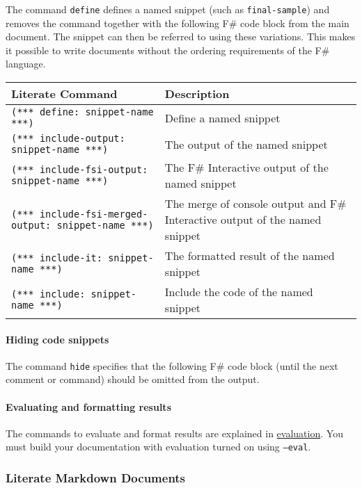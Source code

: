 \documentclass{article}
\begin{document}
The command \texttt{define} defines a named snippet (such as \texttt{final-sample}) and removes the command together with
the following F\# code block from the main document. The snippet can then
be referred to using these variations. This makes it
possible to write documents without the ordering requirements of the
F\# language.
\begin{tabular}{|l|l|}\hline
\textbf{Literate Command} & \textbf{Description}\\ \hline\hline
\texttt{(*** define: snippet-name ***)} & Define a named snippet\\ \hline
\texttt{(*** include-output: snippet-name ***)} & The output of the named snippet\\ \hline
\texttt{(*** include-fsi-output: snippet-name ***)} & The F\# Interactive output of the named snippet\\ \hline
\texttt{(*** include-fsi-merged-output: snippet-name ***)} & The merge of console output and F\# Interactive output of the named snippet\\ \hline
\texttt{(*** include-it: snippet-name ***)} & The formatted result of the named snippet\\ \hline
\texttt{(*** include: snippet-name ***)} & Include the code of the named snippet\\ \hline
\end{tabular}

\paragraph{Hiding code snippets}



The command \texttt{hide} specifies that the following F\# code block (until the next comment or command) should be
omitted from the output.
\paragraph{Evaluating and formatting results}



The commands to evaluate and format results are explained in \href{evaluation.html}{evaluation}.
You must build your documentation with evaluation turned on using \texttt{--eval}.
\subsubsection*{Literate Markdown Documents}
\end{document}
